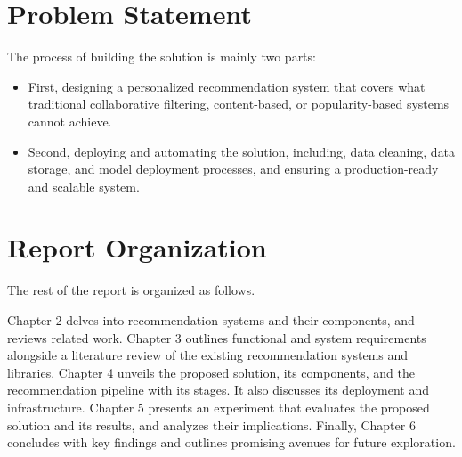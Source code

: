 \section{Problem Statement}

The process of building the solution is mainly two parts:

\begin{itemize}
    \item First, designing a personalized recommendation system that covers what traditional collaborative filtering, content-based, or popularity-based systems cannot achieve.
    \item Second, deploying and automating the solution, including, data cleaning, data storage, and model deployment processes, and ensuring a production-ready and scalable system.
\end{itemize}
\section{Report Organization}

The rest of the report is organized as follows. 

Chapter 2 delves into recommendation systems and their components, and reviews related work. 
Chapter 3 outlines functional and system requirements alongside 
a literature review of the existing
recommendation systems and libraries. Chapter 4 unveils the proposed solution, 
its components, and the recommendation pipeline with its stages. 
It also discusses its deployment and infrastructure. 
Chapter 5 presents an experiment that evaluates the proposed solution and its results, and analyzes their implications. 
Finally, Chapter 6 
concludes with key findings and outlines promising avenues for 
future exploration.
